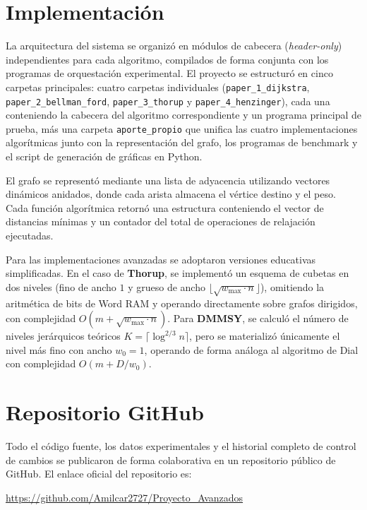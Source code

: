 \documentclass[conference]{IEEEtran}
\begin{document}
\section{Implementación}

La arquitectura del sistema se organizó en módulos de cabecera (\textit{header-only}) independientes para cada algoritmo, compilados de forma conjunta con los programas de orquestación experimental. El proyecto se estructuró en cinco carpetas principales: cuatro carpetas individuales (\texttt{paper\_1\_dijkstra}, \texttt{paper\_2\_bellman\_ford}, \texttt{paper\_3\_thorup} y \texttt{paper\_4\_henzinger}), cada una conteniendo la cabecera del algoritmo correspondiente y un programa principal de prueba, más una carpeta \texttt{aporte\_propio} que unifica las cuatro implementaciones algorítmicas junto con la representación del grafo, los programas de benchmark y el script de generación de gráficas en Python.

El grafo se representó mediante una lista de adyacencia utilizando vectores dinámicos anidados, donde cada arista almacena el vértice destino y el peso. Cada función algorítmica retornó una estructura conteniendo el vector de distancias mínimas y un contador del total de operaciones de relajación ejecutadas.

Para las implementaciones avanzadas se adoptaron versiones educativas simplificadas. En el caso de \textbf{Thorup}, se implementó un esquema de cubetas en dos niveles (fino de ancho $1$ y grueso de ancho $\lfloor\sqrt{w_{\max}\cdot n}\rfloor$), omitiendo la aritmética de bits de Word RAM y operando directamente sobre grafos dirigidos, con complejidad $O(m + \sqrt{w_{\max}\cdot n})$. Para \textbf{DMMSY}, se calculó el número de niveles jerárquicos teóricos $K = \lceil\log^{2/3}n\rceil$, pero se materializó únicamente el nivel más fino con ancho $w_0=1$, operando de forma análoga al algoritmo de Dial con complejidad $O(m + D/w_0)$.

\section{Repositorio GitHub}

Todo el código fuente, los datos experimentales y el historial completo de control de cambios se publicaron de forma colaborativa en un repositorio público de GitHub. El enlace oficial del repositorio es:

\begin{center}
    \url{https://github.com/Amilcar2727/Proyecto_Avanzados}
\end{center}
\end{document}
